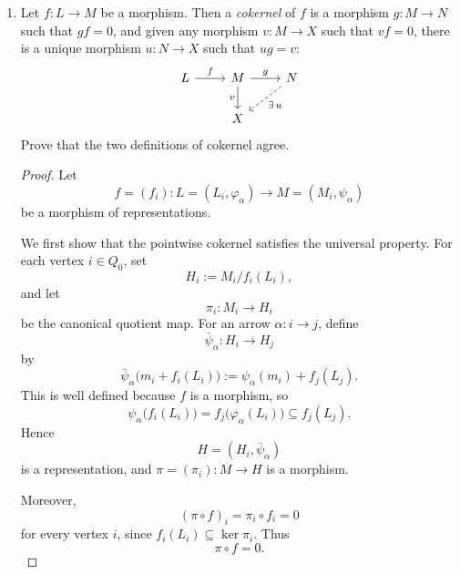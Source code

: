 \documentclass[11pt, a4paper]{article}
\begin{document}
\begin{enumerate}[leftmargin=*, label=\textbf{\arabic*.}]
\begin{enumerate}[label=(\alph*)]
\begin{proof}
    Therefore $\operatorname{im}(h') = \ker(\pi_2)$, and the top row is exact.
    \end{proof}
\end{enumerate}

\item Let $f \colon L \to M$ be a morphism. Then a \emph{cokernel} of $f$ is a morphism $g \colon M \to N$ such that $g f = 0$, and given any morphism $v \colon M \to X$ such that $v f = 0$, there is a unique morphism $u \colon N \to X$ such that $u g = v$:
\[
\begin{tikzcd}
L \arrow[r, "f"] & M \arrow[r, "g"] \arrow[d, "v"'] & N \arrow[dl, dashed, "\exists\, u"] \\
& X
\end{tikzcd}
\]
Prove that the two definitions of cokernel agree.

\begin{proof}
    Let
    \[
    f=(f_i)\colon L=(L_i,\varphi_\alpha)\to M=(M_i,\psi_\alpha)
    \]
    be a morphism of representations.
    
    We first show that the pointwise cokernel satisfies the universal property. For each vertex $i\in Q_0$, set
    \[
    H_i:=M_i/f_i(L_i),
    \]
    and let
    \[
    \pi_i\colon M_i\to H_i
    \]
    be the canonical quotient map. For an arrow $\alpha\colon i\to j$, define
    \[
    \bar{\psi}_\alpha\colon H_i\to H_j
    \]
    by
    \[
    \bar{\psi}_\alpha\bigl(m_i+f_i(L_i)\bigr):=\psi_\alpha(m_i)+f_j(L_j).
    \]
    This is well defined because $f$ is a morphism, so
    \[
    \psi_\alpha\bigl(f_i(L_i)\bigr)=f_j\bigl(\varphi_\alpha(L_i)\bigr)\subseteq f_j(L_j).
    \]
    Hence
    \[
    H=(H_i,\bar{\psi}_\alpha)
    \]
    is a representation, and $\pi=(\pi_i)\colon M\to H$ is a morphism.
    
    Moreover,
    \[
    (\pi\circ f)_i=\pi_i\circ f_i=0
    \]
    for every vertex $i$, since $f_i(L_i)\subseteq \ker \pi_i$. Thus
    \[
    \pi\circ f=0.
    \]
    

\end{proof}
\end{enumerate}
\end{document}
